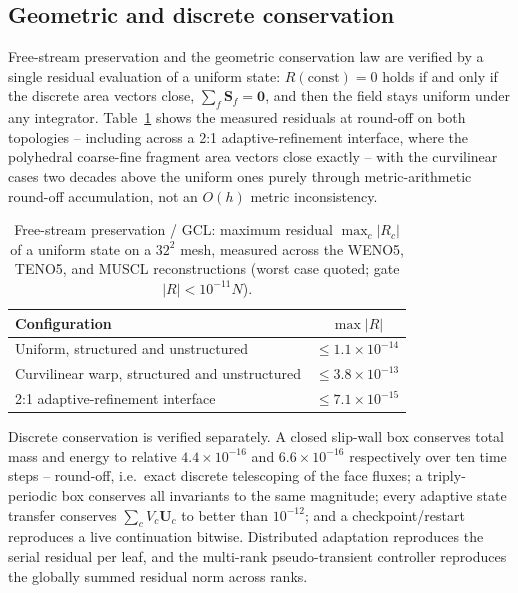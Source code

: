 \documentclass[journal,biblatex]{new-aiaa}
\newcommand{\U}{\mathbf{U}}
\begin{document}
\subsection{Geometric and discrete conservation}
\label{sec:vv-conservation}

Free-stream preservation and the geometric conservation law are verified by a single residual evaluation of a uniform state: $R(\mathrm{const})=0$ holds if and only if the discrete area vectors close, $\sum_f\mathbf{S}_f=\mathbf{0}$, and then the field stays uniform under any integrator. Table~\ref{tab:gcl} shows the measured residuals at round-off on both topologies -- including across a 2:1 adaptive-refinement interface, where the polyhedral coarse-fine fragment area vectors close exactly -- with the curvilinear cases two decades above the uniform ones purely through metric-arithmetic round-off accumulation, not an $O(h)$ metric inconsistency.

\begin{table}[H]
\centering\footnotesize\setlength{\tabcolsep}{6pt}
\caption{Free-stream preservation / GCL: maximum residual $\max_c|R_c|$ of a
uniform state on a $32^2$ mesh, measured across the WENO5, TENO5, and MUSCL
reconstructions (worst case quoted; gate $|R|<10^{-11}N$).}
\label{tab:gcl}
\begin{tabular}{@{}lc@{}}
\toprule
Configuration & $\max|R|$ \\
\midrule
Uniform, structured and unstructured & $\le1.1\times10^{-14}$ \\
Curvilinear warp, structured and unstructured & $\le3.8\times10^{-13}$ \\
2:1 adaptive-refinement interface & $\le7.1\times10^{-15}$ \\
\bottomrule
\end{tabular}
\end{table}

Discrete conservation is verified separately. A closed slip-wall box conserves total mass and energy to relative $4.4\times10^{-16}$ and $6.6\times10^{-16}$ respectively over ten time steps -- round-off, i.e.\ exact discrete telescoping of the face fluxes; a triply-periodic box conserves all invariants to the same magnitude; every adaptive state transfer conserves $\sum_c V_c\U_c$ to better than $10^{-12}$; and a checkpoint/restart reproduces a live continuation bitwise. Distributed adaptation reproduces the serial residual per leaf, and the multi-rank pseudo-transient controller reproduces the globally summed residual norm across ranks.
\end{document}
